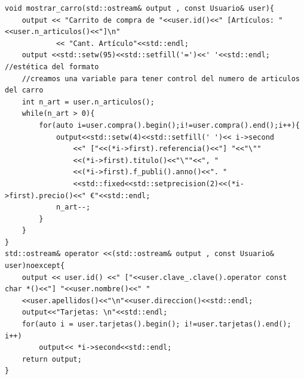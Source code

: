 \begin{verbatim}
void mostrar_carro(std::ostream& output , const Usuario& user){
    output << "Carrito de compra de "<<user.id()<<" [Artículos: "<<user.n_articulos()<<"]\n"
            << "Cant. Artículo"<<std::endl;
    output <<std::setw(95)<<std::setfill('=')<<' '<<std::endl; //estética del formato
    //creamos una variable para tener control del numero de articulos del carro
    int n_art = user.n_articulos();
    while(n_art > 0){
        for(auto i=user.compra().begin();i!=user.compra().end();i++){
            output<<std::setw(4)<<std::setfill(' ')<< i->second
                <<" ["<<(*i->first).referencia()<<"] "<<"\""
                <<(*i->first).titulo()<<"\""<<", "
                <<(*i->first).f_publi().anno()<<". "
                <<std::fixed<<std::setprecision(2)<<(*i->first).precio()<<" €"<<std::endl;
            n_art--;
        }
    }
}
std::ostream& operator <<(std::ostream& output , const Usuario& user)noexcept{
    output << user.id() <<" ["<<user.clave_.clave().operator const char *()<<"] "<<user.nombre()<<" "
    <<user.apellidos()<<"\n"<<user.direccion()<<std::endl;
    output<<"Tarjetas: \n"<<std::endl;
    for(auto i = user.tarjetas().begin(); i!=user.tarjetas().end(); i++)
        output<< *i->second<<std::endl;
    return output;
}
    
\end{verbatim}